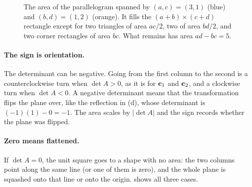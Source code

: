 \begin{figure}[ht]
  \centering
  \caption{The area of the parallelogram spanned by $(a, c) = (3, 1)$
    (blue) and $(b, d) = (1, 2)$ (orange). It fills the
    $(a + b) \times (c + d)$ rectangle except for two triangles of
    area $ac/2$, two of area $bd/2$, and two corner rectangles of area
    $bc$. What remains has area $ad - bc = 5$.}
  \label{fig:ch03-det-box}
\end{figure}

\paragraph{The sign is orientation.}
The determinant can be negative. Going from the first column to the
second is a counterclockwise turn when $\det A > 0$, as it is for
$\bm{e}_1$ and $\bm{e}_2$, and a clockwise turn when $\det A < 0$. A
negative determinant means that the transformation flips the plane over,
like the reflection in (d), whose determinant
is $(-1)(1) - 0 = -1$. The area scales by $|\det A|$ and the sign records
whether the plane was flipped.

\paragraph{Zero means flattened.}
If $\det A = 0$, the unit square goes to a shape with no area: the two
columns point along the same line (or one of them is zero), and the whole
plane is squashed onto that line or onto the origin.
 shows all three cases.


